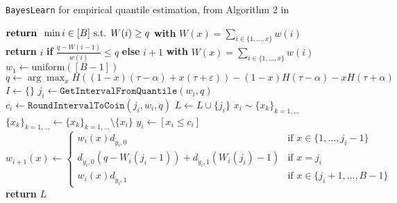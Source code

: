 \begin{algorithm*}[t]
\caption{\texttt{BayesLearn} for empirical quantile estimation, from Algorithm 2 in \cite{gretta2023sharp}}\label{alg: BayesLearn}
\begin{algorithmic}[1]
    \STATE $\textbf{return\, } \min i \in [B] \text{ s.t. } W(i)\geq q$ \textbf{ with } $W(x)=\sum_{i\in\{1, \dots, x\}}w(i)$
\ENDFUNCTION\\
\hspace{0.5 cm}
    \STATE \textbf{return } $i$ \textbf{ if } $\frac{q-W(i-1)}{w(i)}\leq q$ \textbf{ else } $i+1$ \textbf{ with } $W(x)=\sum_{i\in\{1, \dots, x\}}w(i)$
\ENDFUNCTION\\
\hspace{0.5 cm}
\STATE $w_1 \gets \text{uniform}([B-1])$
\STATE $q \gets \arg \max_{x}H((1-x)(\tau -\alpha)+x(\tau +\varepsilon))-(1-x)H(\tau -\alpha)-xH(\tau + \alpha)$
\STATE $I \gets \{\}$ 
    \STATE $j_i \gets \texttt{GetIntervalFromQuantile}(w_i, q)$
    \STATE $c_i \gets \texttt{RoundIntervalToCoin}(j_i, w_i, q)$ 
    \STATE $L\gets L \cup \{j_i\}$
    \STATE $x_i \sim \{x_k\}_{k=1,\dots}$ 
    \STATE $\{x_k\}_{k=1,\dots}\gets \{x_k\}_{k=1,\dots} \setminus \{x_i\}$ 
    \STATE $y_i \gets [x_i \leq c_i]$ 
    \STATE $w_{i+1}(x)\gets \begin{cases}
        w_i(x)d_{\tilde{y}_i,0} & \text{if } x\in \{1, \dots, j_i-1\}\\
        d_{\tilde{y}_i,0}(q-W_i(j_i-1))+d_{\tilde{y}_i, 1}(W_{i}(j_i)-1) & \text{if } x= j_i\\
        w_{i}(x)d_{\tilde{y}_i, 1} & \text{if } x\in \{j_i +1 , \dots, B-1\}
    \end{cases}$
\ENDFOR
\STATE \textbf{return} $L$ 
\ENDFUNCTION
\end{algorithmic}
\end{algorithm*}